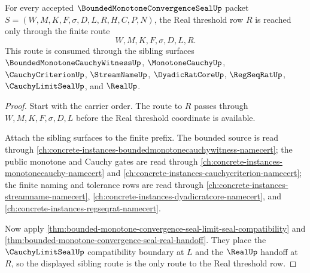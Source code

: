 \begin{theorem}
\label{thm:bounded-monotone-convergence-seal-real-threshold-route}
For every accepted $\BoundedMonotoneConvergenceSealUp$ packet $S=(W,M,K,F,\sigma,D,L,R,H,C,P,N)$, the Real threshold row $R$ is reached only through the finite route
$$
W,M,K,F,\sigma,D,L,R.
$$
This route is consumed through the sibling surfaces $\BoundedMonotoneCauchyWitnessUp$, $\MonotoneCauchyUp$, $\CauchyCriterionUp$, $\StreamNameUp$, $\DyadicRatCoreUp$, $\RegSeqRatUp$, $\CauchyLimitSealUp$, and $\RealUp$.
\end{theorem}
\begin{proof}
Start with the carrier order. The route to $R$ passes through $W,M,K,F,\sigma,D,L$ before the Real threshold coordinate is available.

Attach the sibling surfaces to the finite prefix. The bounded source is read through \autoref{ch:concrete-instances-boundedmonotonecauchywitness-namecert}; the public monotone and Cauchy gates are read through \autoref{ch:concrete-instances-monotonecauchy-namecert} and \autoref{ch:concrete-instances-cauchycriterion-namecert}; the finite naming and tolerance rows are read through \autoref{ch:concrete-instances-streamname-namecert}, \autoref{ch:concrete-instances-dyadicratcore-namecert}, and \autoref{ch:concrete-instances-regseqrat-namecert}.

Now apply \autoref{thm:bounded-monotone-convergence-seal-limit-seal-compatibility} and \autoref{thm:bounded-monotone-convergence-seal-real-handoff}. They place the $\CauchyLimitSealUp$ compatibility boundary at $L$ and the $\RealUp$ handoff at $R$, so the displayed sibling route is the only route to the Real threshold row.
\end{proof}

